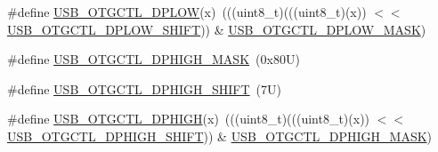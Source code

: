 \begin{DoxyCompactItemize}
\item 
\#define \mbox{\hyperlink{group___u_s_b___register___masks_ga7620238bdd46f65a58ce5713a301bfc5}{U\+S\+B\+\_\+\+O\+T\+G\+C\+T\+L\+\_\+\+D\+P\+L\+OW}}(x)~(((uint8\+\_\+t)(((uint8\+\_\+t)(x)) $<$$<$ \mbox{\hyperlink{group___u_s_b___register___masks_ga94318731712f5399af57fefe46ac8cec}{U\+S\+B\+\_\+\+O\+T\+G\+C\+T\+L\+\_\+\+D\+P\+L\+O\+W\+\_\+\+S\+H\+I\+FT}})) \& \mbox{\hyperlink{group___u_s_b___register___masks_gad6a988a0338aa5fcd511f9644b2375eb}{U\+S\+B\+\_\+\+O\+T\+G\+C\+T\+L\+\_\+\+D\+P\+L\+O\+W\+\_\+\+M\+A\+SK}})
\item 
\#define \mbox{\hyperlink{group___u_s_b___register___masks_ga58ba9522df4e9a18c7efa0472837c30c}{U\+S\+B\+\_\+\+O\+T\+G\+C\+T\+L\+\_\+\+D\+P\+H\+I\+G\+H\+\_\+\+M\+A\+SK}}~(0x80\+U)
\item 
\#define \mbox{\hyperlink{group___u_s_b___register___masks_ga898efaea515cbbb64826b7685082665f}{U\+S\+B\+\_\+\+O\+T\+G\+C\+T\+L\+\_\+\+D\+P\+H\+I\+G\+H\+\_\+\+S\+H\+I\+FT}}~(7\+U)
\item 
\#define \mbox{\hyperlink{group___u_s_b___register___masks_gaf606f58fa2872eb5ff39eb9ca5c740bd}{U\+S\+B\+\_\+\+O\+T\+G\+C\+T\+L\+\_\+\+D\+P\+H\+I\+GH}}(x)~(((uint8\+\_\+t)(((uint8\+\_\+t)(x)) $<$$<$ \mbox{\hyperlink{group___u_s_b___register___masks_ga898efaea515cbbb64826b7685082665f}{U\+S\+B\+\_\+\+O\+T\+G\+C\+T\+L\+\_\+\+D\+P\+H\+I\+G\+H\+\_\+\+S\+H\+I\+FT}})) \& \mbox{\hyperlink{group___u_s_b___register___masks_ga58ba9522df4e9a18c7efa0472837c30c}{U\+S\+B\+\_\+\+O\+T\+G\+C\+T\+L\+\_\+\+D\+P\+H\+I\+G\+H\+\_\+\+M\+A\+SK}})
\end{DoxyCompactItemize}
